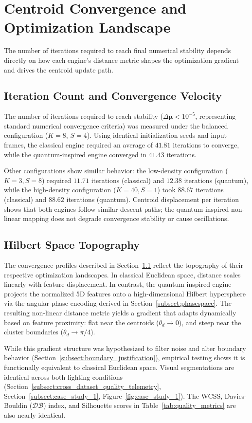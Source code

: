 \section{Centroid Convergence and Optimization Landscape}
The number of iterations required to reach final numerical stability depends directly on how each engine's distance metric shapes the optimization gradient and drives the centroid update path.

\subsection{Iteration Count and Convergence Velocity}\label{subsect:convergence_velocity}
The number of iterations required to reach stability ($\Delta\boldsymbol{\mu} < 10^{-5}$, representing standard numerical convergence criteria) was measured under the balanced configuration ($K=8$, $S=4$). Using identical initialization seeds and input frames, the classical engine required an average of $41.81$ iterations to converge, while the quantum-inspired engine converged in $41.43$ iterations.

Other configurations show similar behavior: the low-density configuration ($K=3, S=8$) required $11.71$ iterations (classical) and $12.38$ iterations (quantum), while the high-density configuration ($K=40, S=1$) took $88.67$ iterations (classical) and $88.62$ iterations (quantum). Centroid displacement per iteration shows that both engines follow similar descent paths; the quantum-inspired non-linear mapping does not degrade convergence stability or cause oscillations.

\subsection{Hilbert Space Topography}
The convergence profiles described in Section~\ref{subsect:convergence_velocity} reflect the topography of their respective optimization landscapes. In classical Euclidean space, distance scales linearly with feature displacement. In contrast, the quantum-inspired engine projects the normalized 5D features onto a high-dimensional Hilbert hypersphere via the angular phase encoding derived in Section~\ref{subsect:phasespace}. The resulting non-linear distance metric yields a gradient that adapts dynamically based on feature proximity: flat near the centroids ($\theta_d \to 0$), and steep near the cluster boundaries ($\theta_d \to \pi/4$).

While this gradient structure was hypothesized to filter noise and alter boundary behavior (Section~\ref{subsect:boundary_justification}), empirical testing shows it is functionally equivalent to classical Euclidean space. Visual segmentations are identical across both lighting conditions (Section~\ref{subsect:cross_dataset_quality_telemetry}, Section~\ref{subsect:case_study_1}, Figure~\ref{fig:case_study_1}). The WCSS, Davies-Bouldin ($\mathcal{D}\mathcal{B}$) index, and Silhouette scores in Table~\ref{tab:quality_metrics} are also nearly identical.

